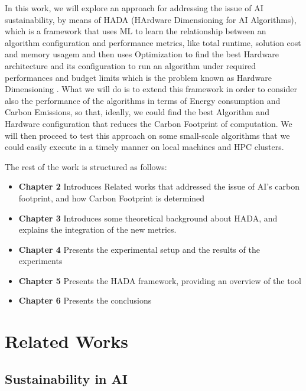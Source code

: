 \documentclass[a4paper,singleside,12pt]{report} %
\begin{document}
In this work, we will explore an approach for addressing the issue of AI sustainability, by means of HADA (HArdware 
Dimensioning for AI Algorithms), which is a framework that uses ML to learn the relationship between an algorithm 
configuration and performance metrics, like total runtime, solution cost and memory usagem and then uses Optimization to find 
the best Hardware architecture and its configuration to run an algorithm under required performances and budget limits
which is the problem known as Hardware Dimensioning \cite{DEFILIPPO2022109199}. What we will do is to extend this framework
in order to consider also the performance of the algorithms in terms of Energy consumption and Carbon Emissions, so that, 
ideally, we could find the best Algorithm and Hardware configuration that reduces the Carbon Footprint of computation. We 
will then proceed to test this approach on some small-scale algorithms that we could easily execute in a timely manner 
on local machines and HPC clusters.

The rest of the work is structured as follows:
\begin{itemize}
    \item \textbf{Chapter 2} Introduces Related works that addressed the issue of AI's carbon footprint, and how Carbon Footprint is determined
    \item \textbf{Chapter 3} Introduces some theoretical background about HADA, and explains the integration of the new metrics.
    \item \textbf{Chapter 4} Presents the experimental setup and the results of the experiments
    \item \textbf{Chapter 5} Presents the HADA framework, providing an overview of the tool
    \item \textbf{Chapter 6} Presents the conclusions
\end{itemize}

\chapter{Related Works}

\section{Sustainability in AI}
\end{document}
